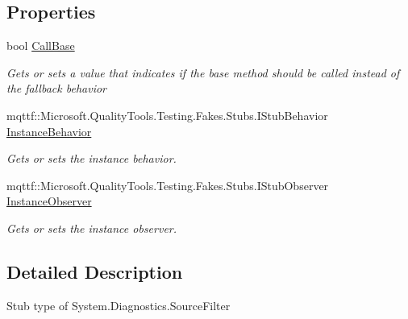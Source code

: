 \subsection*{Properties}
\begin{DoxyCompactItemize}
\item 
bool \hyperlink{class_system_1_1_diagnostics_1_1_fakes_1_1_stub_source_filter_a55ae900bfa486bf23d7e8f521549a740}{Call\-Base}
\begin{DoxyCompactList}\small\item\em Gets or sets a value that indicates if the base method should be called instead of the fallback behavior\end{DoxyCompactList}\item 
mqttf\-::\-Microsoft.\-Quality\-Tools.\-Testing.\-Fakes.\-Stubs.\-I\-Stub\-Behavior \hyperlink{class_system_1_1_diagnostics_1_1_fakes_1_1_stub_source_filter_a0a68cd2d5af247dc8154c51e3c490ef2}{Instance\-Behavior}
\begin{DoxyCompactList}\small\item\em Gets or sets the instance behavior.\end{DoxyCompactList}\item 
mqttf\-::\-Microsoft.\-Quality\-Tools.\-Testing.\-Fakes.\-Stubs.\-I\-Stub\-Observer \hyperlink{class_system_1_1_diagnostics_1_1_fakes_1_1_stub_source_filter_a0540f5280e0cf50dce2f2410e569bf7d}{Instance\-Observer}
\begin{DoxyCompactList}\small\item\em Gets or sets the instance observer.\end{DoxyCompactList}\end{DoxyCompactItemize}


\subsection{Detailed Description}
Stub type of System.\-Diagnostics.\-Source\-Filter



